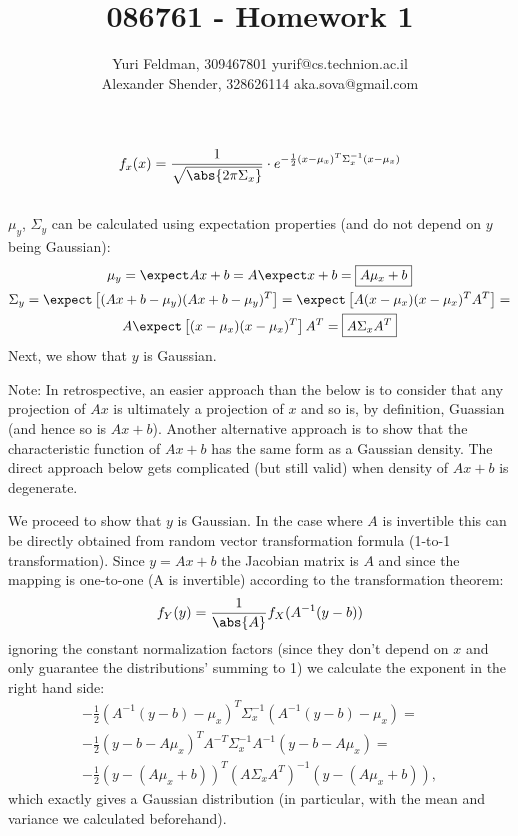 \documentclass[a4paper]{scrreprt}
\title{086761 - Homework 1}
\author{Yuri Feldman, 309467801 yurif@cs.technion.ac.il \\
	    Alexander Shender, 328626114 aka.sova@gmail.com }
\begin{document}
\maketitle
\chapter{}
\section{}
\begin{gather}
	f_x(x) = \frac{1}{\sqrt{\abs{2\pi\Sigma_x}}} \cdot 
	e^{-\frac{1}{2}(x-\mu_x)^T\Sigma_x^{-1} (x-\mu_x)}
\end{gather}
\section{}
$\mu_y$, $\Sigma_y$ can be calculated using expectation properties (and do not 
depend on $y$ being Gaussian):
\begin{gather}
	\mu_y = \expect Ax + b = A\expect x + b = \boxed{A\mu_x + b} \\
	\Sigma_y = \expect\left[ (Ax+b-\mu_y)(Ax+b-\mu_y)^T\right] = 
	\expect\left[ A(x-\mu_x)(x-\mu_x)^T A^T \right] = \\
	A\expect\left[ 
	(x-\mu_x)(x-\mu_x)^T\right] A^T = \boxed{A\Sigma_x A^T}
\end{gather}
Next, we show that $y$ is Gaussian. 

Note: In retrospective, an easier approach than the below is to consider that any projection of $Ax$ is ultimately a projection of $x$ and so is, by definition, Guassian (and hence so is $Ax+b$). Another alternative approach is to show that the characteristic function of $Ax+b$ has the same form as a Gaussian density. The direct approach below gets complicated (but still valid) when density of $Ax+b$ is degenerate. 

We proceed to show that $y$ is Gaussian. In the case where $A$ is invertible this 
can be directly obtained from random vector transformation formula (1-to-1 
transformation). Since $y=Ax+b$ the Jacobian matrix is $A$ and since the 
mapping is one-to-one (A is invertible) according to the transformation 
theorem: 
\begin{gather}
	f_Y(y) = \frac{1}{\abs{A}} f_X(A^{-1}(y-b))
\end{gather}
ignoring the constant normalization factors (since they don't depend on $x$ and 
only guarantee the distributions' summing to 1) we calculate the exponent in 
the 
right hand side: 
\begin{gather}
	-\frac{1}{2}\left(A^{-1}(y-b)-\mu_x\right)^T\Sigma_x^{-1}\left(A^{-1}(y-b)-\mu_x\right)
	 = \\
	-\frac{1}{2}\left(y-b-A\mu_x\right)^TA^{-T}\Sigma_x^{-1}A^{-1}\left(y-b-A\mu_x\right)
	 = \\
		-\frac{1}{2}\left(y-(A\mu_x+b)\right)^T\left(A\Sigma_xA^T\right)^{-1}\left(y-(A\mu_x+b)\right),
\end{gather}
which exactly gives a Gaussian distribution (in particular, with the mean and 
variance we calculated beforehand). 
\end{document}
